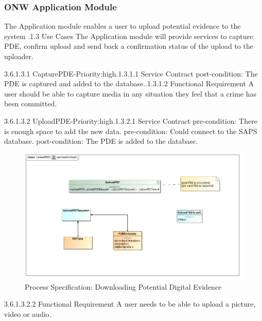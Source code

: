 \documentclass[a4paper,12pt]{article}
\begin{document}
\subsubsection {ONW Application Module}

The  Application module enables a user to upload potential evidence to the system .1.3 Use Cases\newline
The Application module will provide services to capture PDE, confirm upload and send back a confirmation status of the upload to the uploader.\newline

3.6.1.3.1 CapturePDE-Priority:high.1.3.1.1 Service Contract\newline
	post-condition: The PDE is captured and added to the database..1.3.1.2 Functional Requirement\newline
    A user should be able to capture media in any situation they feel that a crime has been committed.\newline


3.6.1.3.2 UploadPDE-Priority:high.1.3.2.1 Service Contract\newline
	pre-condition: There is enough space to add the new data.\newline
	pre-condition: Could connect to the SAPS database.\newline
	post-condition: The PDE is added to the database.\newline
		\begin{figure}[H]
\includegraphics[width=\textwidth]{images/UploadserviceContract.jpg}
\caption{Process Specification: Downloading Potential Digital Evidence \label{overflow}}
\end{figure}
	3.6.1.3.2.2 Functional Requirement\newline
	A user needs to be able to upload a picture, video or audio.\newline
	
\end{document}
